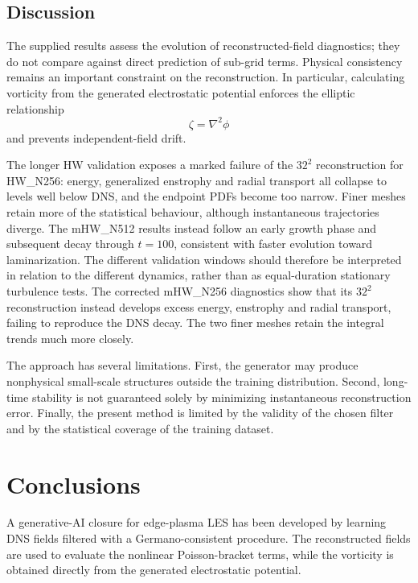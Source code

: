 \documentclass[authoryear,preprint,review,12pt]{elsarticle}
\begin{document}
\subsection{Discussion}
The supplied results assess the evolution of reconstructed-field diagnostics; they do not compare against direct prediction of sub-grid terms. Physical consistency remains an important constraint on the reconstruction. In particular, calculating vorticity from the generated electrostatic potential enforces the elliptic relationship
\[
\zeta=\nabla^2\phi
\]
and prevents independent-field drift.

The longer HW validation exposes a marked failure of the $32^2$ reconstruction for HW\_N256: energy, generalized enstrophy and radial transport all collapse to levels well below DNS, and the endpoint PDFs become too narrow. Finer meshes retain more of the statistical behaviour, although instantaneous trajectories diverge. The mHW\_N512 results instead follow an early growth phase and subsequent decay through $t=100$, consistent with faster evolution toward laminarization. The different validation windows should therefore be interpreted in relation to the different dynamics, rather than as equal-duration stationary turbulence tests. The corrected mHW\_N256 diagnostics show that its $32^2$ reconstruction instead develops excess energy, enstrophy and radial transport, failing to reproduce the DNS decay. The two finer meshes retain the integral trends much more closely.

The approach has several limitations. First, the generator may produce nonphysical small-scale structures outside the training distribution. Second, long-time stability is not guaranteed solely by minimizing instantaneous reconstruction error. Finally, the present method is limited by the validity of the chosen filter and by the statistical coverage of the training dataset.
%
%
%
%
%
%
%
\section{Conclusions}\label{sec:Conclusions}

A generative-AI closure for edge-plasma LES has been developed by learning DNS fields filtered with a Germano-consistent procedure. The reconstructed fields are used to evaluate the nonlinear Poisson-bracket terms, while the vorticity is obtained directly from the generated electrostatic potential.
\end{document}
